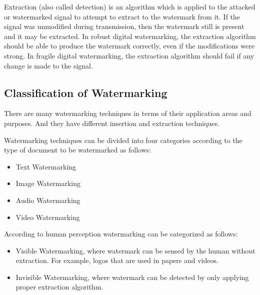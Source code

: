 \documentclass[12pt,a4paper]{report}
\begin{document}
\bigskip

Extraction (also called detection) is an algorithm which is applied to the attacked or watermarked signal to attempt to extract to the watermark from it. If the signal was unmodified during transmission, then the watermark still is present and it may be extracted. In robust digital watermarking, the extraction algorithm should be able to produce the watermark correctly, even if the modifications were strong. In fragile digital watermarking, the extraction algorithm should fail if any change is made to the signal. %


\subsection{Classification of Watermarking}

There are many watermarking techniques in terms of their application areas and purposes. And they have different insertion and extraction techniques. 

\bigskip

Watermarking  techniques  can  be  divided  into  four  categories  according  to  the type of document to be watermarked as follows:

\begin{itemize}

\item Text Watermarking
\item Image Watermarking
\item Audio Watermarking
\item Video Watermarking

\end{itemize}

\bigskip

According to human perception watermarking can be categorized as follows:

\begin{itemize}

\item Visible Watermarking, where watermark can be sensed by the human without extraction. For example, logos that are used in papers and videos.

\item Invisible Watermarking, where watermark can be detected by only applying proper extraction algorithm.

\end{itemize}
\end{document}
